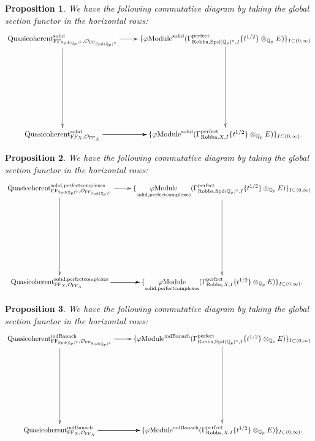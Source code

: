 \documentclass[12pt]{book}
\newtheorem{proposition}{Proposition}
\theoremstyle{definition}
\begin{document}
\begin{proposition}
We have the following commutative diagram by taking the global section functor in the horizontal rows:\\
\[\displayindent=+0in
\xymatrix@R+7pc{
\mathrm{Quasicoherent}^{\mathrm{solid}}_{\mathrm{FF}_{\mathrm{Spd}(\mathbb{Q}_p)^\diamond},\mathcal{O}_{\mathrm{FF}_{\mathrm{Spd}(\mathbb{Q}_p)^\diamond}}} \ar[r] \ar[d] &\{\varphi\mathrm{Module}^{\mathrm{solid}}(\Gamma^\text{perfect}_{\text{Robba},{\mathrm{Spd}(\mathbb{Q}_p)^\diamond},I}\{t^{1/2}\}\otimes_{\mathbb{Q}_p}E)\}_{I\subset (0,\infty)} \ar[d]\\
\mathrm{Quasicoherent}^{\mathrm{solid}}_{\mathrm{FF}_X,\mathcal{O}_{\mathrm{FF}_X}}  \ar[r] \ar[r] \ar[r] &\{\varphi\mathrm{Module}^{\mathrm{solid}}(\Gamma^\text{perfect}_{\text{Robba},X,I}\{t^{1/2}\}\otimes_{\mathbb{Q}_p}E)\}_{I\subset (0,\infty)}.  \\  
}
\]
\end{proposition}

\begin{proposition}
We have the following commutative diagram by taking the global section functor in the horizontal rows:\\
\[\displayindent=+0in
\xymatrix@R+7pc{
\mathrm{Quasicoherent}^{\mathrm{solid,perfectcomplexes}}_{\mathrm{FF}_{\mathrm{Spd}(\mathbb{Q}_p)^\diamond},\mathcal{O}_{\mathrm{FF}_{\mathrm{Spd}(\mathbb{Q}_p)^\diamond}}} \ar[r] \ar[d] &\{\underset{\mathrm{solid,perfectcomplexes}}{\varphi\mathrm{Module}}(\Gamma^\text{perfect}_{\text{Robba},{\mathrm{Spd}(\mathbb{Q}_p)^\diamond},I}\{t^{1/2}\}\otimes_{\mathbb{Q}_p}E)\}_{I\subset (0,\infty)} \ar[d]  \\
\mathrm{Quasicoherent}^{\mathrm{solid,perfectcomplexes}}_{\mathrm{FF}_X,\mathcal{O}_{\mathrm{FF}_X}}  \ar[r] \ar[r] \ar[r] &\{\underset{\mathrm{solid,perfectcomplexes}}{\varphi\mathrm{Module}}(\Gamma^\text{perfect}_{\text{Robba},X,I}\{t^{1/2}\}\otimes_{\mathbb{Q}_p}E)\}_{I\subset (0,\infty)}.   
}
\]
\end{proposition}

\begin{proposition}
We have the following commutative diagram by taking the global section functor in the horizontal rows:\\
\[\displayindent=+0in
\xymatrix@R+7pc{
\mathrm{Quasicoherent}^{\mathrm{indBanach}}_{\mathrm{FF}_{\mathrm{Spd}(\mathbb{Q}_p)^\diamond},\mathcal{O}_{\mathrm{FF}_{\mathrm{Spd}(\mathbb{Q}_p)^\diamond}}} \ar[r] \ar[d] &\{\varphi\mathrm{Module}^\text{indBanach}(\Gamma^\text{perfect}_{\text{Robba},{\mathrm{Spd}(\mathbb{Q}_p)^\diamond},I}\{t^{1/2}\}\otimes_{\mathbb{Q}_p}E)\}_{I\subset (0,\infty)}\ar[d]\\
\mathrm{Quasicoherent}^{\mathrm{indBanach}}_{\mathrm{FF}_X,\mathcal{O}_{\mathrm{FF}_X}}  \ar[r] \ar[r] \ar[r] &\{\varphi\mathrm{Module}^{\mathrm{indBanach}}(\Gamma^\text{perfect}_{\text{Robba},X,I}\{t^{1/2}\}\otimes_{\mathbb{Q}_p}E)\}_{I\subset (0,\infty)}.    
}
\]
\end{proposition}
\end{document}
